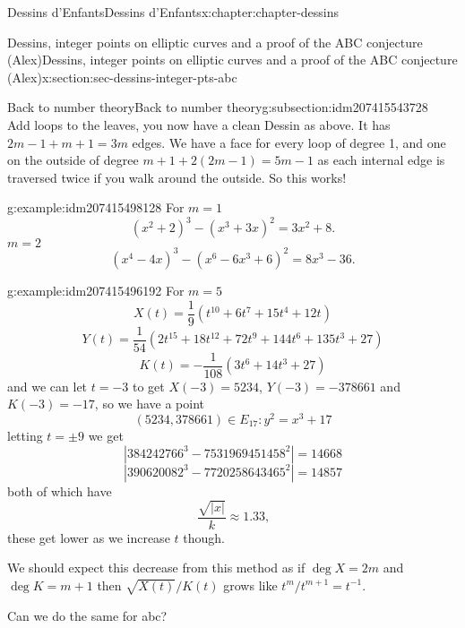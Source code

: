 \documentclass[oneside,10pt,]{book}
\numberwithin{equation}{section}
\newcommand{\inv}{^{-1}}
\begin{document}
\begin{chapterptx}{Dessins d'Enfants}{}{Dessins d'Enfants}{}{}{x:chapter:chapter-dessins}
\begin{sectionptx}{Dessins, integer points on elliptic curves and a proof of the ABC conjecture (Alex)}{}{Dessins, integer points on elliptic curves and a proof of the ABC conjecture (Alex)}{}{}{x:section:sec-dessins-integer-pts-abc}
\begin{subsectionptx}{Back to number theory}{}{Back to number theory}{}{}{g:subsection:idm207415543728}
\begin{equation*}
\end{equation*}
Add loops to the leaves, you now have a clean Dessin as above. It has \(2m- 1 + m + 1 = 3m\) edges. We have a face for every loop of degree 1, and one on the outside of degree \(m+ 1 +2(2m-1)  = 5m - 1\) as each internal edge is traversed twice if you walk around the outside. So this works!%
\begin{example}{}{g:example:idm207415498128}%
For \(m= 1\)%
\begin{equation*}
(x^2 + 2)^3 - (x^3 + 3x)^2 = 3x^2 + 8\text{.}
\end{equation*}
\(m= 2\)%
\begin{equation*}
(x^4 - 4x)^3 - (x^6 -6x^3+6)^2  = 8x^3 - 36\text{.}
\end{equation*}
%
\end{example}
\begin{example}{}{g:example:idm207415496192}%
For \(m =5\)%
\begin{equation*}
X(t) = \frac 19 (t^{10} + 6t^7 +15 t^4 + 12t)
\end{equation*}
%
\begin{equation*}
Y(t) = \frac{1}{54} (2t^{15} + 18t^{12} +72 t^9 + 144 t^6 + 135 t^3 + 27)
\end{equation*}
%
\begin{equation*}
K(t) = -\frac{1}{108} (3t^{6} + 14t^3 +27)
\end{equation*}
and we can let \(t = -3\) to get \(X(-3) = 5234\), \(Y(-3) = -378661\) and \(K(-3) = -17\), so we have a point%
\begin{equation*}
(5234, 378661) \in E_{17} \colon y^2 = x^3 + 17
\end{equation*}
letting \(t = \pm 9\) we get%
\begin{equation*}
|384242766^3 - 7531969451458^2| = 14668
\end{equation*}
%
\begin{equation*}
|390620082^3 - 7720258643465^2| = 14857
\end{equation*}
both of which have%
\begin{equation*}
\frac{\sqrt{|x|}}{k} \approx 1.33\text{,}
\end{equation*}
these get lower as we increase \(t\) though.%
\end{example}
We should expect this decrease from this method as if \(\deg X = 2m\) and \(\deg K = m + 1\) then \(\sqrt{X(t)}/K(t)\) grows like \(t^{m}/t^{m+1} = t\inv\).%
\par
Can we do the same for abc?%
\par

\end{subsectionptx}
\end{sectionptx}
\end{chapterptx}
\end{document}

